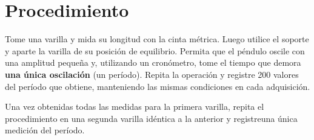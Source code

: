 \section{Procedimiento}

Tome una varilla y mida su longitud con la cinta métrica. Luego utilice el 
soporte y aparte la varilla de su posición de equilibrio. Permita que el 
péndulo oscile con una amplitud pequeña y, utilizando un cronómetro, tome el
tiempo que demora \textbf{una única oscilación} (un período). Repita la 
operación y registre 200 valores del período que obtiene, manteniendo las
mismas condiciones en cada adquisición.

Una vez obtenidas todas las medidas para la primera varilla, repita el
procedimiento en una segunda varilla idéntica a la anterior y registreuna 
única medición del período.
